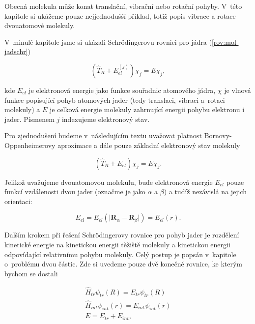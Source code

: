 
Obecná molekula může konat translační, vibrační nebo rotační pohyby. V~této kapitole si ukážeme pouze nejjednodušší příklad, totiž popis vibrace a rotace dvouatomové molekuly.

\noindent V~minulé kapitole jsme si ukázali Schrödingerovu rovnici pro jádra (\ref{rov:mol-jadschr})

\begin{displaymath}
\left(\hat{T}_R+E_{el}^{(j)}\right)\chi_j = E \chi_j,
\end{displaymath}

\noindent kde $E_{el}$ je elektronová energie jako funkce souřadnic atomového jádra, $\chi$ je vlnová funkce popisující pohyb atomových jader (tedy translaci, vibraci a~rotaci molekuly) a $E$ je celková energie molekuly zahrnující energii pohybu elektronu i jader.  Písmenem $j$ indexujeme elektronový stav.

\noindent Pro zjednodušení budeme v~následujícím textu uvažovat platnost Bornovy-Oppenheimerovy aproximace a dále pouze základní elektronový stav molekuly

\begin{displaymath}
\left(\hat{T}_R+E_{el}\right)\chi_j = E \chi_j.
\end{displaymath}
 
\noindent Jelikož uvažujeme dvouatomovou molekulu, bude elektronová energie $E_{el}$ pouze funkcí vzdálenosti dvou jader (označme je jako $\alpha$ a $\beta$) a tudíž nezávislá na jejich orientaci:

\begin{displaymath}
	E_{el}=E_{el} (\vert \textbf{R}_{\alpha}-\textbf{R}_{\beta} \vert ) = E_{el}(r).
\end{displaymath} 

Dalším krokem při řešení Schr\"odingerovy rovnice pro pohyb jader je rozdělení kinetické energie na kinetickou energii těžiště molekuly a kinetickou energii odpovídající relativnímu pohybu molekuly. Celý postup je popsán v~kapitole o~problému dvou částic. Zde si uvedeme pouze dvě konečné rovnice, ke kterým bychom se dostali

\begin{eqnarray}
\hat{H}_{tr}\psi_{tr}(R)=E_{tr}\psi_{tr}(R)
\label{vibrot:trans}\\
\hat{H}_{int}\psi_{int}(r)=E_{int}\psi_{int}(r)
\label{vibrot:vibrot}\\
E=E_{tr}+E_{int},
\end{eqnarray}

